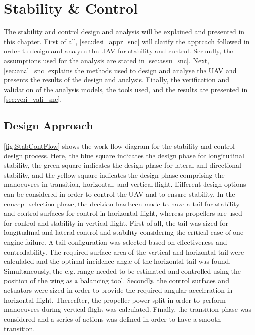 \chapter{Stability \& Control}
\setlength{\parindent}{15pt}
\label{ch:stab_cont}

The stability and control design and analysis will be explained and presented in this chapter. First of all, \autoref{sec:desi_appr_snc} will clarify the approach followed in order to design and analyse the UAV for stability and control. Secondly, the assumptions used for the analysis are stated in \autoref{sec:assu_snc}. Next, \autoref{sec:anal_snc} explains the methods used to design and analyse the UAV and presents the results of the design and analysis. Finally, the verification and validation of the analysis models, the tools used, and the results are presented in \autoref{sec:veri_vali_snc}.

\section{Design Approach}
\label{sec:desi_appr_snc}

\autoref{fig:StabContFlow} shows the work flow diagram for the stability and control design process. Here, the blue square indicates the design phase for longitudinal stability, the green square indicates the design phase for lateral and directional stability, and the yellow square indicates the design phase comprising the manoeuvres in transition, horizontal, and vertical flight. Different design options can be considered in order to control the UAV and to ensure stability. In the concept selection phase, the decision has been made to have a tail for stability and control surfaces for control in horizontal flight, whereas propellers are used for control and stability in vertical flight. First of all, the tail was sized for longitudinal and lateral control and stability considering the critical case of one engine failure. A tail configuration was selected based on effectiveness and controllability. The required surface area of the vertical and horizontal tail were calculated and the optimal incidence angle of the horizontal tail was found. Simultaneously, the c.g. range needed to be estimated and controlled using the position of the wing as a balancing tool. Secondly, the control surfaces and actuators were sized in order to provide the required angular acceleration in horizontal flight. Thereafter, the propeller power split in order to perform manoeuvres during vertical flight was calculated. Finally, the transition phase was considered and a series of actions was defined in order to have a smooth transition.  %

